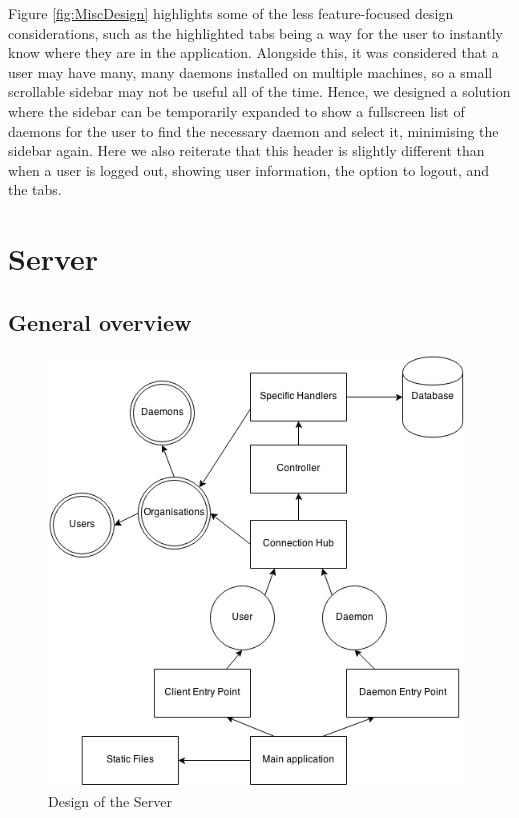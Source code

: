 \documentclass{l3proj}
\begin{document}
Figure \ref{fig:MiscDesign} highlights some of the less feature-focused design considerations, such as the highlighted tabs being a way for the user to instantly know where they are in the application. Alongside this, it was considered that a user may have many, many daemons installed on multiple machines, so a small scrollable sidebar may not be useful all of the time. Hence, we designed a solution where the sidebar can be temporarily expanded to show a fullscreen list of daemons for the user to find the necessary daemon and select it, minimising the sidebar again. Here we also reiterate that this header is slightly different than when a user is logged out, showing user information, the option to logout, and the tabs.


\section{Server}

\subsection{General overview}

\begin{figure}[H]
\centering
\includegraphics[width=110mm]{images/ServerDesign.png}
\caption{Design of the Server}
\label{fig:ServerDesign}
\end{figure}
\end{document}
